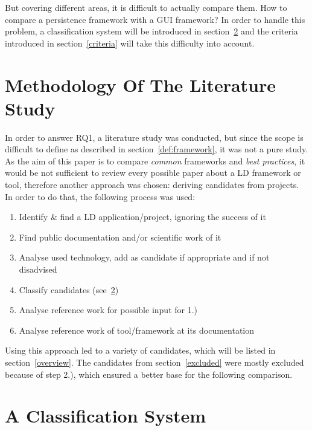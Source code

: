 But covering different areas, it is difficult to actually compare them. How to compare a persistence framework with a GUI framework? In order to handle this problem, a classification system will be introduced in section~\ref{classification} and the criteria introduced in section~\ref{criteria} will take this difficulty into account.

\section{Methodology Of The Literature Study}\label{meth_study}
In order to answer RQ1, a literature study was conducted, but since the scope is difficult to define as described in section~\ref{def:framework}, it was not a pure study. As the aim of this paper is to compare \textit{common} frameworks and \textit{best practices}, it would be not sufficient to review every possible paper about a LD framework or tool, therefore another approach was chosen: deriving candidates from projects. In order to do that, the following process was used:

\begin{enumerate}
\item Identify \& find a LD application/project, ignoring the success of it
\item Find public documentation and/or scientific work of it
\item Analyse used technology, add as candidate if appropriate and if not disadvised
\item Classify candidates (see~\ref{classification})
\item Analyse reference work for possible input for 1.)
\item Analyse reference work of tool/framework at its documentation
\end{enumerate}

Using this approach led to a variety of candidates, which will be listed in section~\ref{overview}. The candidates from section~\ref{excluded} were mostly excluded because of step 2.), which ensured a better base for the following comparison.

\section{A Classification System}\label{classification}

